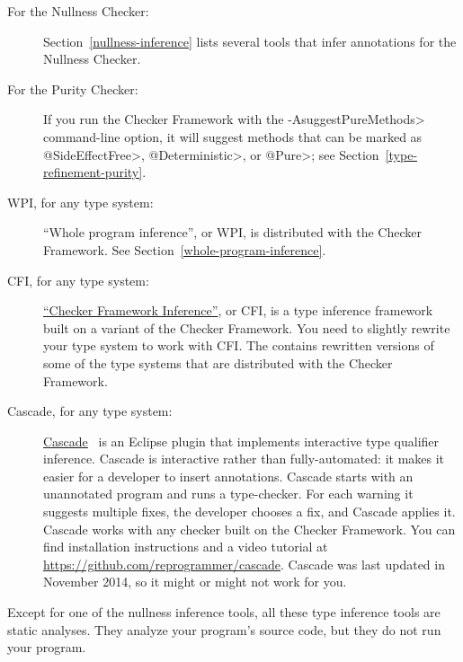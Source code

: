 \begin{description}
  \item[For the Nullness Checker:]
Section~\ref{nullness-inference} lists several tools that infer
annotations for the Nullness Checker.

\item[For the Purity Checker:]
If you run the Checker Framework with the \<-AsuggestPureMethods>
command-line option, it will suggest methods that can be marked as
\<@SideEffectFree>, \<@Deterministic>, or \<@Pure>; see
Section~\ref{type-refinement-purity}.

\item[WPI, for any type system:]
``Whole program inference'', or WPI, is distributed with the Checker
  Framework.  See Section~\ref{whole-program-inference}.

\item[CFI, for any type system:]
\href{https://github.com/opprop/checker-framework-inference}{``Checker
  Framework Inference''}, or CFI, is a type inference framework built on
a variant of the Checker Framework.  You need to slightly rewrite your type system to
work with CFI\@.  The
 contains rewritten versions of some of
the type systems that are distributed with the Checker Framework.

\item[Cascade, for any type system:]
\href{https://github.com/reprogrammer/cascade/}{Cascade}~\cite{VakilianPEJ2015}
is an Eclipse plugin that implements interactive type qualifier inference.
Cascade is interactive rather than fully-automated:  it makes it easier for
a developer to insert annotations.
Cascade starts with an unannotated program and runs a type-checker.  For each
warning it suggests multiple fixes, the developer chooses a fix, and
Cascade applies it.  Cascade works with any checker built on the Checker
Framework.
You can find installation instructions and a video tutorial at \url{https://github.com/reprogrammer/cascade}.
Cascade was last updated in November 2014, so it might or might not work for you.

\end{description}

Except for one of the nullness inference tools, all these
type inference tools are static analyses.  They analyze your program's
source code, but they do not run your program.


